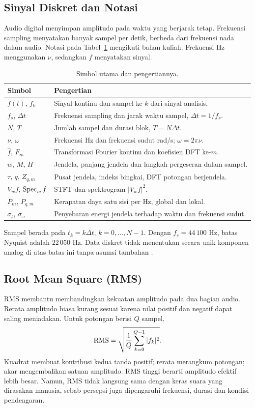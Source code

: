 \subsection{Sinyal Diskret dan Notasi}
Audio digital menyimpan amplitudo pada waktu yang berjarak tetap.
Frekuensi sampling menyatakan banyak sampel per detik, berbeda dari
frekuensi nada dalam audio. Notasi pada Tabel~\ref{tab:notasi}
mengikuti bahan kuliah. Frekuensi Hz menggunakan $\nu$, sedangkan
$f$ menyatakan sinyal.
\begin{table}[H]
\centering\small
\caption{Simbol utama dan pengertiannya.}\label{tab:notasi}
\begin{tabular}{p{.22\linewidth}p{.7\linewidth}}
\toprule
Simbol & Pengertian \\
\midrule
$f(t)$, $f_k$ & Sinyal kontinu dan sampel ke-$k$ dari sinyal analisis. \\
$f_s$, $\Delta t$ & Frekuensi sampling dan jarak waktu sampel, $\Delta t=1/f_s$. \\
$N$, $T$ & Jumlah sampel dan durasi blok, $T=N\Delta t$. \\
$\nu$, $\omega$ & Frekuensi Hz dan frekuensi sudut rad/s; $\omega=2\pi\nu$. \\
$\widehat f$, $F_m$ & Transformasi Fourier kontinu dan koefisien DFT ke-$m$. \\
$w$, $M$, $H$ & Jendela, panjang jendela dan langkah pergeseran dalam sampel. \\
$\tau$, $q$, $Z_{q,m}$ & Pusat jendela, indeks bingkai, DFT potongan berjendela. \\
$V_wf$, $\operatorname{Spec}_wf$ & STFT dan spektrogram $|V_wf|^2$. \\
$P_m$, $P_{q,m}$ & Kerapatan daya satu sisi per Hz, global dan lokal. \\
$\sigma_t$, $\sigma_\omega$ & Penyebaran energi jendela terhadap waktu dan frekuensi sudut. \\
\bottomrule
\end{tabular}
\end{table}
Sampel berada pada $t_k=k\Delta t$, $k=0,\ldots,N-1$.
Dengan $f_s=44\,100$ Hz, batas Nyquist adalah $22\,050$ Hz.
Data diskret tidak menentukan secara unik komponen analog di atas
batas ini tanpa asumsi tambahan \cite{kuliah5}.

\subsection{Root Mean Square (RMS)}
RMS membantu membandingkan kekuatan amplitudo pada dua bagian audio.
Rerata amplitudo biasa kurang sesuai karena nilai positif dan negatif
dapat saling meniadakan. Untuk potongan berisi $Q$ sampel,
\begin{equation}
 \operatorname{RMS}=\sqrt{\frac1Q\sum_{k=0}^{Q-1}|f_k|^2}.
 \label{eq:rms}
\end{equation}
Kuadrat membuat kontribusi kedua tanda positif; rerata merangkum
potongan; akar mengembalikan satuan amplitudo. RMS tinggi berarti
amplitudo efektif lebih besar. Namun, RMS tidak langsung sama dengan
keras suara yang dirasakan manusia, sebab persepsi juga dipengaruhi
frekuensi, durasi dan kondisi pendengaran.

